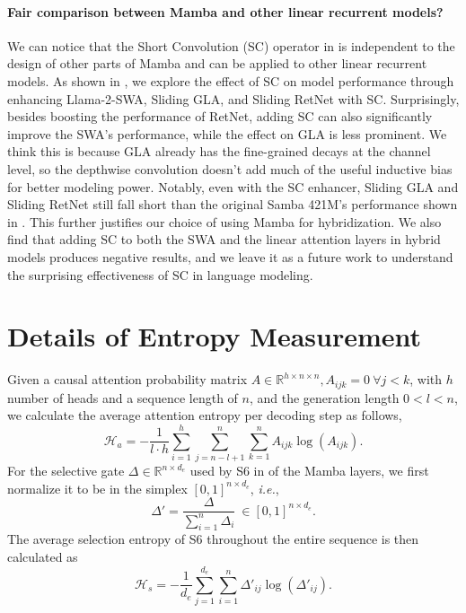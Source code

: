 \documentclass{article}
\begin{document}
\paragraph{Fair comparison between Mamba and other linear recurrent models?} We can notice that the Short Convolution (SC) operator in   is independent to the design of other parts of Mamba and can be applied to other linear recurrent models. As shown in ,  we explore the effect of SC on model performance through enhancing Llama-2-SWA, Sliding GLA, and Sliding RetNet with SC. Surprisingly, besides boosting the performance of RetNet, adding SC can also significantly improve the SWA's performance, while the effect on GLA is less prominent. We think this is because GLA already has the fine-grained decays at the channel level, so the depthwise convolution doesn't add much of the useful inductive bias for better modeling power. Notably, even with the SC enhancer, Sliding GLA and Sliding RetNet still fall short than the original Samba 421M's performance shown in . This further justifies our choice of using Mamba for hybridization. We also find that adding SC to both the SWA and the linear attention layers in hybrid models produces negative results, and we leave it as a future work to understand the surprising effectiveness of SC in language modeling.

\section{Details of Entropy Measurement} \label{app_ent}
Given a causal attention probability matrix $A \in \mathbb{R}^{h \times n \times n}, A_{ijk} = 0 ~\forall j<k $, with $h$ number of heads and a sequence length of $n$, and the generation length $0 < l < n$, we calculate the average attention entropy per decoding step as follows,
\[
\mathcal{H}_{a} = - \frac{1}{l \cdot h}\sum_{i=1}^{h} \sum_{j = n-l+1} ^n  \sum_{k = 1}^n A_{ijk}\log(A_{ijk}).
\]
For the selective gate $\Delta \in \mathbb{R}^{n \times d_e}$ used by S6 in  of the Mamba layers, we first normalize it to be in the simplex $[0, 1]^{n \times d_e}$, \emph{i.e.},
\[
\Delta' = \frac{\Delta}{\sum_{i=1}^{n} \Delta_i} ~ \in [0, 1]^{n \times d_e}.
\]
The average selection entropy of S6 throughout the entire sequence is then calculated as
\[
\mathcal{H}_{s} = - \frac{1}{d_e}  \sum_{j = 1}^{d_e} \sum_{i=1}^{n} \Delta'_{ij}\log(\Delta'_{ij}).
\]
\end{document}
